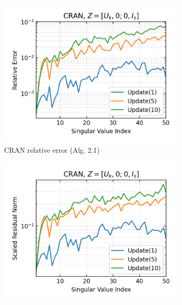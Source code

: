 
\begin{figure}[H]
  \centering
  \begin{subfigure}[b]{0.48\textwidth}
    \centering
    \includegraphics[width=\textwidth]{figures/cran/CRAN_zha-simon_n_batches_10_k_dims_50_rel_err.png}
    \caption{CRAN relative error (Alg. 2.1)}
  \end{subfigure}
  \hfill
  \begin{subfigure}[b]{0.48\textwidth}
    \centering
    \includegraphics[width=\textwidth]{figures/cran/CRAN_zha-simon_n_batches_10_k_dims_50_res_norm.png}

\end{subfigure}
\end{figure}
